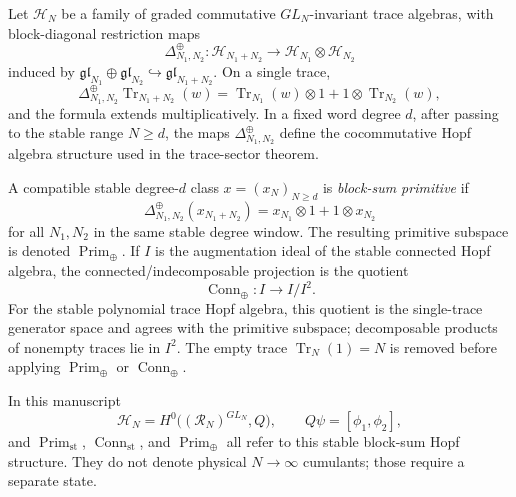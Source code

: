 \begin{defn}\label{defn:block-sum-primitive-projection}
  Let \(\mathcal H_N\) be a family of graded commutative
  \(GL_N\)-invariant trace algebras, with block-diagonal restriction
  maps
  \[
    \Delta^\oplus_{N_1,N_2}\colon
    \mathcal H_{N_1+N_2}
    \longrightarrow
    \mathcal H_{N_1}\otimes\mathcal H_{N_2}
  \]
  induced by
  \(\mathfrak{gl}_{N_1}\oplus\mathfrak{gl}_{N_2}
  \hookrightarrow\mathfrak{gl}_{N_1+N_2}\).  On a single trace,
  \[
    \Delta^\oplus_{N_1,N_2}\operatorname{Tr}_{N_1+N_2}(w)
    =
    \operatorname{Tr}_{N_1}(w)\otimes 1
    +
    1\otimes\operatorname{Tr}_{N_2}(w),
  \]
  and the formula extends multiplicatively.  In a fixed word degree
  \(d\), after passing to the stable range \(N\ge d\), the maps
  \(\Delta^\oplus_{N_1,N_2}\) define the cocommutative Hopf algebra
  structure used in the trace-sector theorem.

  A compatible stable degree-\(d\) class
  \(x=(x_N)_{N\ge d}\) is \emph{block-sum primitive} if
  \[
    \Delta^\oplus_{N_1,N_2}(x_{N_1+N_2})
    =
    x_{N_1}\otimes 1+1\otimes x_{N_2}
  \]
  for all \(N_1,N_2\) in the same stable degree window.  The resulting
  primitive subspace is denoted \(\operatorname{Prim}_{\oplus}\).  If
  \(I\) is the augmentation ideal of the stable connected Hopf algebra,
  the connected/indecomposable projection is the quotient
  \[
    \operatorname{Conn}_{\oplus}\colon
    I\longrightarrow I/I^2 .
  \]
  For the stable polynomial trace Hopf algebra, this quotient is the
  single-trace generator space and agrees with the primitive subspace;
  decomposable products of nonempty traces lie in \(I^2\).  The empty
  trace \(\operatorname{Tr}_N(1)=N\) is removed before applying
  \(\operatorname{Prim}_{\oplus}\) or
  \(\operatorname{Conn}_{\oplus}\).

  In this manuscript
  \[
    \mathcal H_N=
    H^0\bigl((\mathcal R_N)^{GL_N},Q\bigr),
    \qquad Q\psi=[\phi_1,\phi_2],
  \]
  and \(\operatorname{Prim}_{\mathrm{st}}\),
  \(\operatorname{Conn}_{\mathrm{st}}\), and
  \(\operatorname{Prim}_{\oplus}\) all refer to this stable
  block-sum Hopf structure.  They do not denote physical \(N\to\infty\)
  cumulants; those require a separate state.
\end{defn}

